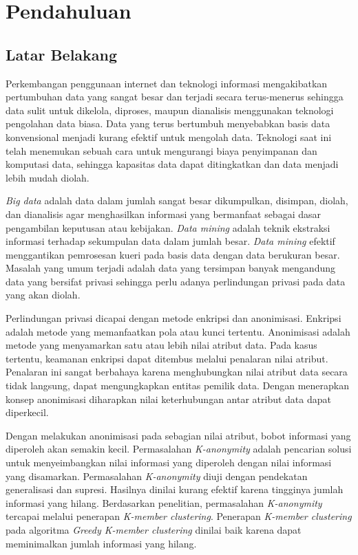 \chapter{Pendahuluan}
\label{chap:intro}
   
\section{Latar Belakang}
\label{sec:label}
Perkembangan penggunaan internet dan teknologi informasi mengakibatkan pertumbuhan data yang sangat besar dan terjadi secara terus-menerus sehingga data sulit untuk dikelola, diproses, maupun dianalisis menggunakan teknologi pengolahan data biasa. Data yang terus bertumbuh menyebabkan basis data konvensional menjadi kurang efektif untuk mengolah data. Teknologi saat ini telah menemukan sebuah cara untuk mengurangi biaya penyimpanan dan komputasi data, sehingga kapasitas data dapat ditingkatkan dan data menjadi lebih mudah diolah.

{\it Big data} adalah data dalam jumlah sangat besar dikumpulkan, disimpan, diolah, dan dianalisis agar menghasilkan informasi yang bermanfaat sebagai dasar pengambilan keputusan atau kebijakan. {\it Data mining} adalah teknik ekstraksi informasi terhadap sekumpulan data dalam jumlah besar. {\it Data mining} efektif menggantikan pemrosesan kueri pada basis data dengan data berukuran besar. Masalah yang umum terjadi adalah data yang tersimpan banyak mengandung data yang bersifat privasi sehingga perlu adanya perlindungan privasi pada data yang akan diolah.

Perlindungan privasi dicapai dengan metode enkripsi dan anonimisasi. Enkripsi adalah metode yang memanfaatkan pola atau kunci tertentu. Anonimisasi adalah metode yang menyamarkan satu atau lebih nilai atribut data. Pada kasus tertentu, keamanan enkripsi dapat ditembus melalui penalaran nilai atribut. Penalaran ini sangat berbahaya karena menghubungkan nilai atribut data secara tidak langsung, dapat mengungkapkan entitas pemilik data. Dengan menerapkan konsep anonimisasi diharapkan nilai keterhubungan antar atribut data dapat diperkecil.

Dengan melakukan anonimisasi pada sebagian nilai atribut, bobot informasi yang diperoleh akan semakin kecil. Permasalahan {\it K-anonymity} adalah pencarian solusi untuk menyeimbangkan nilai informasi yang diperoleh dengan nilai informasi yang disamarkan. Permasalahan {\it K-anonymity} diuji dengan pendekatan generalisasi dan supresi. Hasilnya dinilai kurang efektif karena tingginya jumlah informasi yang hilang. Berdasarkan penelitian, permasalahan {\it K-anonymity} tercapai melalui penerapan {\it K-member clustering}. Penerapan {\it K-member clustering} pada algoritma {\it Greedy K-member clustering} dinilai baik karena dapat meminimalkan jumlah informasi yang hilang.

